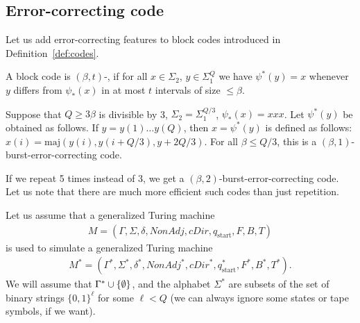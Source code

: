 \documentclass[12pt]{memoir}
\newcommand{\fld}[1]{\ensuremath{\textit{#1}}}
\newcommand{\maj}{\mathrm{maj}}
\def\B{B}
\newcommand{\Tu}{T}
\newcommand{\Tus}{T^{*}}
\newcommand{\cDir}{\fld{cDir}}
\newcommand{\NonAdj}{\fld{NonAdj}}
\newcommand{\start}{\mathrm{start}}
\begin{document}
\subsection{Error-correcting code}\label{sec:coding}

Let us add error-correcting features to block codes introduced in
Definition~\ref{def:codes}.

\begin{sloppypar}
\begin{definition}\label{def:err-code}
A block code is \( (\beta,t) \)-,
if for all \( x\in\Sigma_{2} \), \( y\in\Sigma_{1}^{Q} \) we
have \( \psi^{*}(y)=x \) whenever \( y \) differs from
\( \psi_{*}(x) \) in at most \( t \) intervals of size \( \le\beta \).
\end{definition}
  \end{sloppypar}

\begin{example}\label{xmp:tripling}
  Suppose that \( Q\ge 3\beta \) is divisible by 3,
  \( \Sigma_{2}=\Sigma_{1}^{Q/3} \), \( \psi_{*}(x)=xxx \).
  Let \( \psi^{*}(y) \) be obtained as follows.
  If \( y=y(1)\dots y(Q) \), then \( x=\psi^{*}(y) \) is defined as follows:
    \( x(i)=\maj(y(i),y(i+Q/3),y+2Q/3) \).
    For all \( \beta\le Q/3 \), this is a
    \( (\beta,1) \)-burst-error-correcting code.

    If we repeat 5 times instead of 3, we get a \( (\beta,2) \)-burst-error-correcting
    code.
    Let us note that there are much more efficient such codes than just repetition.
 \end{example}

Let us assume that a generalized Turing machine
\begin{align*}
    M = (\Gamma, \Sigma, \delta, \NonAdj, \cDir, q_{\start},F, \B, \Tu)
\end{align*}
is used to simulate a generalized Turing machine
\begin{align*}
M^* = (\Gamma^{*}, \Sigma^{*}, \delta^{*}, \NonAdj^{*}, \cDir^{*}, q^{*}_{\start},F^{*}, \B^{*}, \Tus).
\end{align*}
We will assume that \( \Gamma^*\cup\mathopen\{\emptyset\mathclose\} \),
and the alphabet \( \Sigma^* \) are subsets of the set of  binary strings
\( \{0,1\}^{\ell} \) for some \( \ell<Q \) (we can always ignore some states or tape
symbols, if we want).
\end{document}
